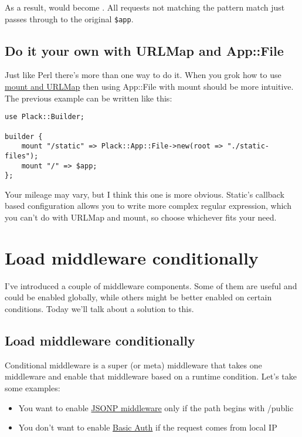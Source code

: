 As a result,  would become
. All requests not matching the pattern match
just passes through to the original \lstinline!$app!.

\section{Do it your own with URLMap and
App::File}\label{do-it-your-own-with-urlmap-and-appfile}

Just like Perl there's more than one way to do it. When you grok how to
use
\href{http://advent.plackperl.org/2009/12/day-12-maps-multiple-apps-with-mount-and-urlmap.html}{mount
and URLMap} then using App::File with mount should be more intuitive.
The previous example can be written like this:

\begin{lstlisting}
use Plack::Builder;

builder {
    mount "/static" => Plack::App::File->new(root => "./static-files");
    mount "/" => $app;
};
\end{lstlisting}

Your mileage may vary, but I think this one is more obvious. Static's
callback based configuration allows you to write more complex regular
expression, which you can't do with URLMap and mount, so choose
whichever fits your need.

\chapter{Load middleware
conditionally}\label{day-18-load-middleware-conditionally}

I've introduced a couple of middleware components. Some of them are
useful and could be enabled globally, while others might be better
enabled on certain conditions. Today we'll talk about a solution to
this.

\section{Load middleware
conditionally}\label{load-middleware-conditionally}

Conditional middleware is a super (or meta) middleware that takes one
middleware and enable that middleware based on a runtime condition.
Let's take some examples:

\begin{itemize}
\itemsep1pt\parskip0pt
\item
  You want to enable
  \href{http://advent.plackperl.org/2009/12/day-16-adding-jsonp-support-to-your-app.html}{JSONP
  middleware} only if the path begins with /public
\item
  You don't want to enable
  \href{http://advent.plackperl.org/2009/12/day-15-authenticate-your-app-with-middleware.html}{Basic
  Auth} if the request comes from local IP
\end{itemize}

